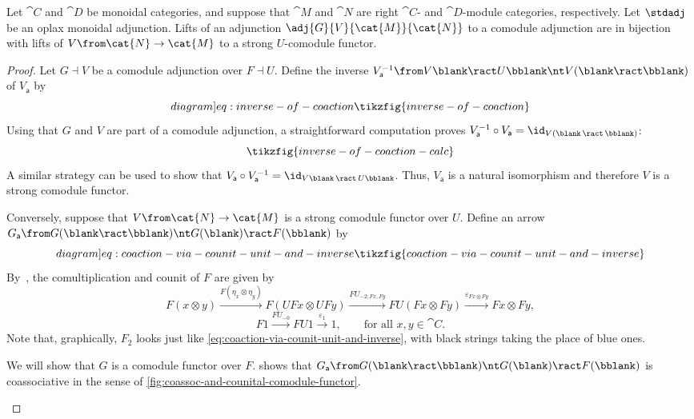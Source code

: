 \begin{theorem}\label{thm:comodule-adjunctions-correspond-to-strong-comodule-functors}
  Let \(\cat{C}\) and \(\cat{D}\) be monoidal categories,
  and suppose that \(\cat{M}\) and \(\cat{N}\) are right \(\cat{C}\)\hyp{} and \(\cat{D}\)\hyp{}module categories, respectively.
  Let \(\stdadj\) be an oplax monoidal adjunction.
  Lifts of an adjunction \(\adj{G}{V}{\cat{M}}{\cat{N}}\) to a comodule adjunction are in bijection with lifts of \(V \from \cat{N} \to \cat{M}\) to a strong \(U\)-comodule functor.
\end{theorem}
\begin{proof}
  Let \(G \dashv V\) be a comodule adjunction over \(F \dashv U\).
  Define the inverse \(V_{\mathsf{a}}^{-1}\from V\blank \ract U\bblank \nt V(\blank \ract \bblank)\) of \(V_{\mathsf{a}}\) by
  \begin{equation}\label[diagram]{eq:inverse-of-coaction}
    \tikzfig{inverse-of-coaction}
  \end{equation}
  Using that \(G\) and \(V\) are part of a comodule adjunction,
  a straightforward computation proves \(V_{\mathsf{a}}^{-1} \circ V_{\mathsf{a}} = \id_{V(\blank \,\ract\, \bblank)}\):
  \[
    \tikzfig{inverse-of-coaction-calc}
  \]
  A similar strategy can be used to show that \(V_{\mathsf{a}} \circ V_{\mathsf{a}}^{-1} = \id_{V\blank \,\ract\, U\bblank}\).
  Thus, \(V_{\mathsf{a}}\) is a natural isomorphism and therefore \(V\) is a strong comodule functor.

  Conversely, suppose that \(V \from \cat{N} \to \cat{M}\) is a strong comodule functor over \(U\).
  Define an arrow \(G_{\mathsf{a}}\from G(\blank \ract \bblank) \nt G(\blank) \ract F(\bblank)\) by
  \begin{equation}\label[diagram]{eq:coaction-via-counit-unit-and-inverse}
    \tikzfig{coaction-via-counit-unit-and-inverse}
  \end{equation}
  By~\cite[Lemma~7.10]{Turaev2017}, the comultiplication and counit of \(F\) are given by
  \[
    F(x \otimes y)
    \xrightarrow{F(\eta_x \otimes \eta_y)} F(UFx \otimes UFy)
    \xrightarrow{F U_{-2; Fx, Fy}} FU(Fx \otimes Fy)
    \xrightarrow{\varepsilon_{Fx \otimes Fy}} Fx \otimes Fy,
  \]
  \[
    F1 \xrightarrow{FU_{-0}} FU1 \xrightarrow{\ \varepsilon_1\ } 1,
    \qquad\text{for all \(x,y \in \cat{C}\)}.
  \]
  Note that, graphically, \(F_2\) looks just like \cref{eq:coaction-via-counit-unit-and-inverse},
  with black strings taking the place of blue ones.

  We will show that \(G\) is a comodule functor over \(F\).
   shows that \(G_{\mathsf{a}}\from G(\blank \ract \bblank) \nt G(\blank) \ract F(\bblank)\) is
  coassociative in the sense of \cref{fig:coassoc-and-counital-comodule-functor}.
  \begin{figure}[htbp]
    \centering
    \vspace{-0.3cm}%
  \end{figure}


\end{proof}
